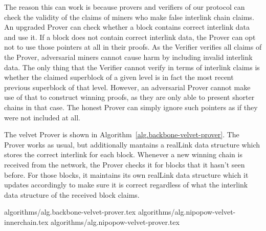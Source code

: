 The reason this can work is because provers and verifiers of our protocol can
check the validity of the claims of miners who make false interlink chain
claims. An upgraded Prover can check whether a block contains correct interlink
data and use it. If a block does not contain correct interlink data, the Prover
can opt not to use those pointers at all in their proofs. As the Verifier
verifies all claims of the Prover, adversarial miners cannot cause harm by
including invalid interlink data. The only thing that the Verifier cannot
verify in terms of interlink claims is whether the claimed superblock of a
given level is in fact the most recent previous superblock of that level.
However, an adversarial Prover cannot make use of that to construct winning
proofs, as they are only able to present shorter chains in that case. The
honest Prover can simply ignore such pointers as if they were not included at
all.

The velvet Prover is shown in Algorithm~\ref{alg.backbone-velvet-prover}. The
Prover works as usual, but additionally mantains a realLink data structure
which stores the correct interlink for each block. Whenever a new winning chain
is received from the network, the Prover checks it for blocks that it hasn't
seen before. For those blocks, it maintains its own realLink data structure
which it updates accordingly to make sure it is correct regardless of what the
interlink data structure of the received block claims.

{algorithms/alg.backbone-velvet-prover.tex}
{algorithms/alg.nipopow-velvet-innerchain.tex}
{algorithms/alg.nipopow-velvet-prover.tex}
